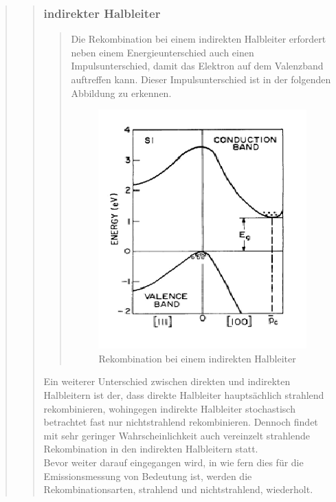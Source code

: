 \begin{quote}
\begin{quote}
\begin{quote}
            
            \end{quote}       
        
            \subsubsection{indirekter Halbleiter}
            \begin{quote}
            Die Rekombination bei einem indirekten Halbleiter erfordert neben
            einem Energieunterschied auch einen Impulsunterschied, damit das
            Elektron auf dem Valenzband auftreffen kann. Dieser
            Impulsunterschied ist in der folgenden Abbildung zu erkennen.
            
            \begin{figure}[H]
                    \centering
                        \includegraphics[scale=0.73, trim = 1cm 0cm 1.5cm 0cm,
                        clip]{./Emissionsbilder/restliches/indirekt.png}
                        \caption{Rekombination bei einem indirekten Halbleiter}
                            \label{fig:./Emissionsbilder/restliches/indirekt.png}
            \end{figure}
            
            \end{quote}       
            
            Ein weiterer Unterschied zwischen direkten und indirekten
            Halbleitern ist der, dass direkte Halbleiter hauptsächlich
            strahlend rekombinieren, wohingegen indirekte Halbleiter
            stochastisch betrachtet fast nur nichtstrahlend rekombinieren.
            Dennoch findet mit sehr geringer Wahrscheinlichkeit auch vereinzelt
            strahlende Rekombination in den indirekten Halbleitern statt.\\
            Bevor weiter darauf eingegangen wird, in wie fern dies für die
            Emissionsmessung von Bedeutung ist, werden die Rekombinationsarten,
            strahlend und nichtstrahlend, wiederholt.
            

\end{quote}
\end{quote}
